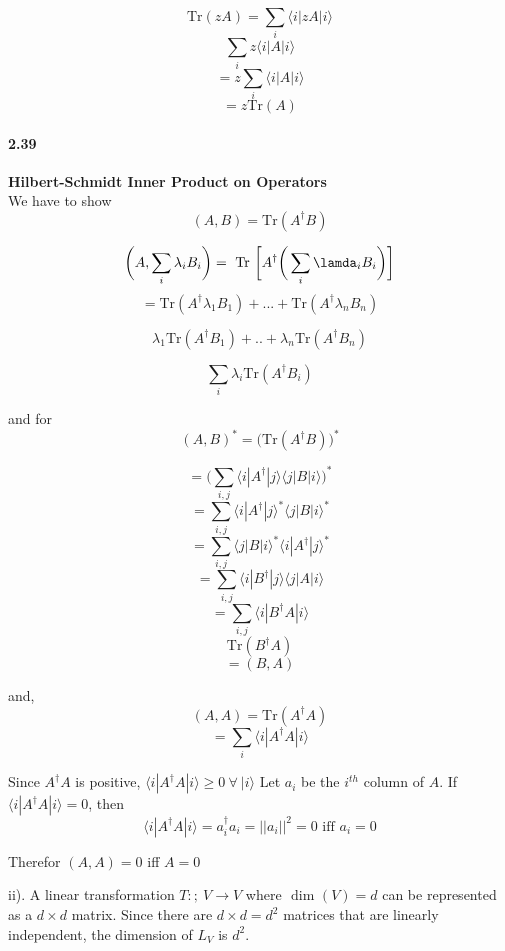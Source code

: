 $$ \text{Tr}(zA) = \sum_i \langle i | zA | i\rangle$$
$$ \sum_i z \langle i |A|i\rangle$$
$$ = z \sum_{i} \langle i |A|i\rangle$$
$$ = z\text{Tr}(A)$$

\paragraph{2.39} \textbf{Hilbert-Schmidt Inner Product on Operators}%
\\

We have to show $$ (A,B) = \text{Tr}(A^{\dagger} B)$$

$$\bigg( A, \sum_i \lambda_i B_i \bigg) = \text{ Tr } \bigg[ A^{\dagger} \bigg(\sum_i \lamda_i B_i \bigg)\bigg]$$
$$ = \text{Tr}(A^{\dagger} \lambda_1 B_1)+ . . . + \text{Tr}(A^{\dagger} \lambda_n B_n)$$

$$ \lambda_1 \text{Tr}(A^{\dagger} B_1) + .. + \lambda_n \text{Tr}(A^{\dagger} B_n)$$

$$ \sum_{i} \lambda_i \text{Tr}(A^{\dagger} B_i)$$

and for
$$ (A,B)^* = \bigg(\text{Tr}(A^{\dagger}B)\bigg)^*$$

$$ = \bigg( \sum_{i,j} \langle i |A^{\dagger} | j\rangle \langle j |B|i\rangle \bigg)^*$$
$$ =\sum_{i,j} \langle i |A^{\dagger}|j\rangle^* \langle j |B |i\rangle^*$$
$$ =  \sum_{i,j} \langle j |B|i\rangle^* \langle i |A^{\dagger} |j\rangle^* $$
$$ =  \sum_{i,j} \langle i |B^{\dagger}|j\rangle \langle j |A |i\rangle$$
$$ =  \sum_{i,j} \langle i |B^{\dagger} A|i\rangle$$
$$ \text{Tr}(B^{\dagger}A)$$
$$ = (B,A)$$

and,
$$ (A,A) = \text{Tr}(A^{\dagger} A)$$
$$ = \sum_i \langle i |A^{\dagger} A | i\rangle$$

Since $A^{\dagger}A$ is positive, $\langle i |A^{\dagger}A|i\rangle \ge 0 \ \forall \ |i\rangle$
Let $a_i$ be the $i^{th}$ column of $A$. If $\langle i |A^{\dagger} A |i \rangle = 0$, then
$$ \langle i |A^{\dagger}A| i\rangle = a_i^{\dagger} a_i = ||a_i||^2 = 0 \text{ iff } a_i = 0$$

Therefor $(A,A) = 0$ iff $A = 0$

ii).   A linear transformation $ T : ; \ V \rightarrow V$ where $\text{ dim }( V )= d$ can be represented as a $d \times d$ matrix. Since there are $d \times d = d^2$ matrices that are linearly independent, the dimension of $L_V$ is $d^2$.